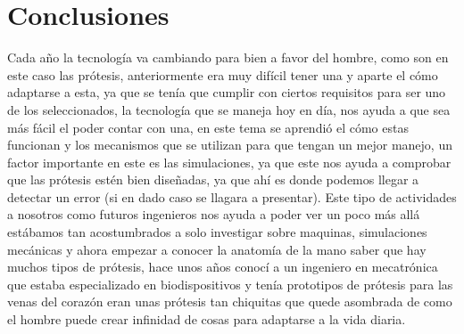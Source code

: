 \documentclass{article}
\begin{document}
\section{Conclusiones}
Cada año la tecnología va cambiando para bien a favor del hombre, como son en este caso las prótesis, anteriormente era muy difícil tener una y aparte el cómo adaptarse a esta, ya que se tenía que cumplir con ciertos requisitos para ser uno de los seleccionados, la tecnología que se maneja hoy en día, nos ayuda a que sea más fácil el poder contar con una, en este tema se aprendió el cómo estas funcionan y los mecanismos que se utilizan para que tengan  un mejor manejo, un factor importante en este es las simulaciones, ya que este nos ayuda a comprobar que las prótesis estén bien diseñadas, ya que ahí es donde podemos llegar a detectar un error (si en dado caso se llagara a presentar).
Este tipo de actividades a nosotros como futuros ingenieros nos ayuda a poder ver un poco más allá estábamos tan acostumbrados a solo investigar sobre maquinas, simulaciones mecánicas y ahora empezar a conocer la anatomía de la mano saber que hay muchos tipos de prótesis, hace unos años conocí a un ingeniero en mecatrónica que estaba especializado en biodispositivos y tenía prototipos de prótesis para las venas del corazón eran unas prótesis tan chiquitas que quede asombrada de como el hombre puede crear infinidad de cosas para adaptarse a la vida diaria.





\end{document}
